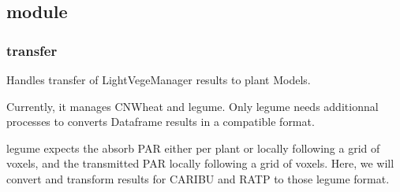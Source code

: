 \documentclass[letterpaper,10pt,english]{sphinxmanual}
\begin{document}
\subsection{ module}
\label{\detokenize{reference:module-transfer}}\label{\detokenize{reference:transfer-module}}

\subsubsection{transfer}
\label{\detokenize{reference:transfer}}
\sphinxAtStartPar
Handles transfer of LightVegeManager results to plant Models.

\sphinxAtStartPar
Currently, it manages CN\sphinxhyphen{}Wheat and l\sphinxhyphen{}egume. Only l\sphinxhyphen{}egume needs additionnal processes to
converts Dataframe results in a compatible format.

\sphinxAtStartPar
l\sphinxhyphen{}egume expects the absorb PAR either per plant or locally following a grid of voxels, and the transmitted PAR
locally following a grid of voxels. Here, we will convert and transform results for CARIBU and RATP to those l\sphinxhyphen{}egume format.
\end{document}
